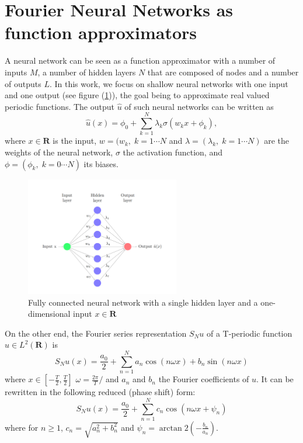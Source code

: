\documentclass[AMS,STIX1COL]{WileyNJD-v2}
\begin{document}
\section{Fourier Neural Networks as function approximators}\label{sec:fnn}
A neural network can be seen as a function approximator with a number of inputs $M$, a number of hidden layers $N$ that are composed of nodes and a number of outputs $L$. In this work, we focus on shallow neural networks with one input and one output (see figure (\ref{fig:NN_single})), the goal being to approximate real valued periodic functions. The output $\hat{u}$ of such neural networks  can be written as
\begin{equation}\label{Eq: NN1d}
  \hat{u}(x) = \phi_0 + \sum_{k = 1}^N \lambda_{k} \sigma\left( w_{k}x + \phi_k \right),
\end{equation}
where $x  \in \mathbf{R}$ is the input, $w = (w_{k},\; k=1\cdots N$ and $\lambda = (\lambda_k,\; k=1\cdots N)$ are the weights of the neural network, $\sigma$ the activation function, and $\phi = (\phi_k,\; k=0\cdots N)$ its biases. 
\begin{figure}[htb]
    \centering
    \includegraphics[width=0.6\textwidth]{nn1.pdf}
    \caption{\;Fully connected neural network with a single hidden layer and a one-dimensional input $x \in \mathbf{R}$}
    \label{fig:NN_single}
\end{figure}


On the other end, the Fourier series representation $S_N u$ of a T-periodic function $u \in L^2(\mathbf R)$ is
\begin{equation}\label{Eq: fourier}
    S_{N}u(x) = \frac{a_0}{2} + \sum_{n=1}^N a_{n} \cos(n \omega  x) + b_{n} \sin(n \omega  x) 
\end{equation}
where $x \in [-\frac{T}{2}, \frac{T}{2}]$ $\omega = \frac{2\pi}{T}/$ and $a_{n}$ and $b_{n}$ the Fourier coefficients of $u$. It can be rewritten in the following reduced (phase shift) form:
 \begin{equation}\label{Eq: fourier_shift}
     S_N u(x) = \frac{a_0}{2} + \sum_{n=1}^N c_{n} \cos(n \omega  x + \psi_{n})
 \end{equation}
where for $n \geq 1$, $c_{n} = \sqrt{a_{n}^2 + b_{n}^2}$ and $\psi_n = \arctan2(-\frac{b_{n}}{a_{n}})$. 
\end{document}
